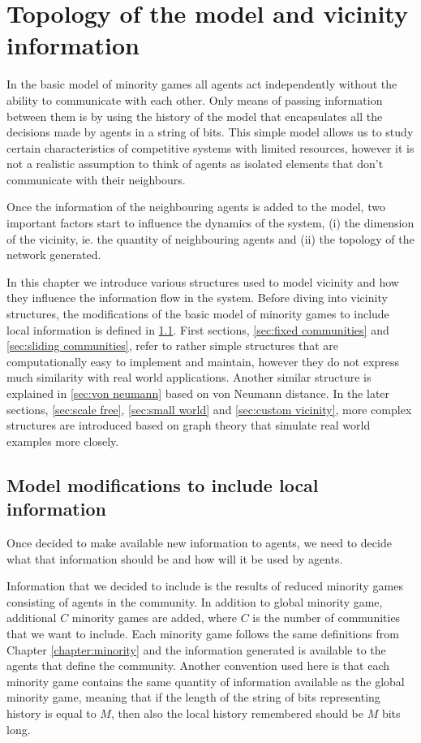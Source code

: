 \chapter{Topology of the model and vicinity information}
\label{chapter:vicinity}

In the basic model of minority games all agents act independently without the ability to communicate with each other.
Only means of passing information between them is by using the history of the model that encapsulates all the decisions made by agents in a string of bits.
This simple model allows us to study certain characteristics of competitive systems with limited resources, however it is not a realistic assumption to think of agents as isolated elements that don't communicate with their neighbours.

Once the information of the neighbouring agents is added to the model, two important factors start to influence the dynamics of the system, (i) the dimension of the vicinity, ie. the quantity of neighbouring agents and (ii) the topology of the network generated.

In this chapter we introduce various structures used to model vicinity and how they influence the information flow in the system.
Before diving into vicinity structures, the modifications of the basic model of minority games to include local information is defined in \ref{sec:model modifications}.
First sections, \ref{sec:fixed communities} and \ref{sec:sliding communities}, refer to rather simple structures that are computationally easy to implement and maintain, however they do not express much similarity with real world applications. 
Another similar structure is explained in \ref{sec:von neumann} based on von Neumann distance. 
In the later sections, \ref{sec:scale free}, \ref{sec:small world} and \ref{sec:custom vicinity}, more complex structures are introduced based on graph theory that simulate real world examples more closely. 

\section{Model modifications to include local information}
\label{sec:model modifications}

Once decided to make available new information to agents, we need to decide what that information should be and how will it be used by agents.

Information that we decided to include is the results of reduced minority games consisting of agents in the community.
In addition to global minority game, additional $C$ minority games are added, where $C$ is the number of communities that we want to include.
Each minority game follows the same definitions from Chapter \ref{chapter:minority} and the information generated is available to the agents that define the community. 
Another convention used here is that each minority game contains the same quantity of information available as the global minority game, meaning that if the length of the string of bits representing history is equal to $M$, then also the local history remembered should be $M$ bits long.

